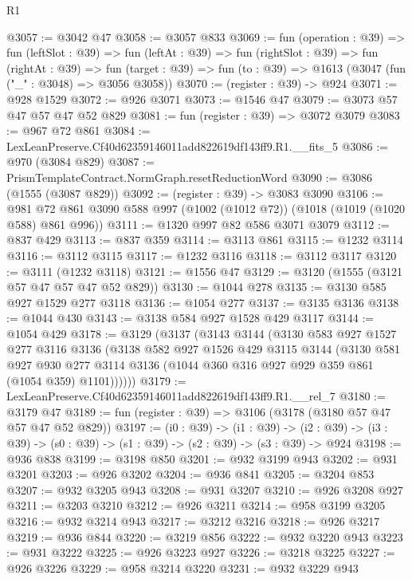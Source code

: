 \begin{lexlean}{R1}
\begin{coremodule}
@3057 := @3042 @47
@3058 := @3057 @833
@3069 := fun (operation : @39) =>
  fun (leftSlot : @39) =>
  fun (leftAt : @39) =>
  fun (rightSlot : @39) =>
  fun (rightAt : @39) =>
  fun (target : @39) => fun (to : @39) => @1613 (@3047 (fun ("_" : @3048) => @3056 @3058))
@3070 := (register : @39) -> @924
@3071 := @928 @1529
@3072 := @926 @3071
@3073 := @1546 @47
@3079 := @3073 @57 @47 @57 @47 @52 @829
@3081 := fun (register : @39) => @3072 @3079
@3083 := @967 @72 @861
@3084 := LexLeanPreserve.Cf40d62359146011add822619df143ff9.R1.__fits_5
@3086 := @970 (@3084 @829)
@3087 := PrismTemplateContract.NormGraph.resetReductionWord
@3090 := @3086 (@1555 (@3087 @829))
@3092 := (register : @39) -> @3083 @3090
@3106 := @981 @72 @861 @3090 @588 @997 (@1002 (@1012 @72)) (@1018 (@1019 (@1020 @588) @861 @996))
@3111 := @1320 @997 @82 @586 @3071 @3079
@3112 := @837 @429
@3113 := @837 @359
@3114 := @3113 @861
@3115 := @1232 @3114
@3116 := @3112 @3115
@3117 := @1232 @3116
@3118 := @3112 @3117
@3120 := @3111 (@1232 @3118)
@3121 := @1556 @47
@3129 := @3120 (@1555 (@3121 @57 @47 @57 @47 @52 @829))
@3130 := @1044 @278
@3135 := @3130 @585 @927 @1529 @277 @3118
@3136 := @1054 @277
@3137 := @3135 @3136
@3138 := @1044 @430
@3143 := @3138 @584 @927 @1528 @429 @3117
@3144 := @1054 @429
@3178 := @3129
    (@3137
      (@3143
        @3144
        (@3130
          @583
          @927
          @1527
          @277
          @3116
          @3136
          (@3138
            @582
            @927
            @1526
            @429
            @3115
            @3144
            (@3130
              @581
              @927
              @930
              @277
              @3114
              @3136
              (@1044 @360 @316 @927 @929 @359 @861 (@1054 @359) @1101))))))
@3179 := LexLeanPreserve.Cf40d62359146011add822619df143ff9.R1.__rel_7
@3180 := @3179 @47
@3189 := fun (register : @39) => @3106 (@3178 (@3180 @57 @47 @57 @47 @52 @829))
@3197 := (i0 : @39) ->
  (i1 : @39) ->
  (i2 : @39) -> (i3 : @39) -> (s0 : @39) -> (s1 : @39) -> (s2 : @39) -> (s3 : @39) -> @924
@3198 := @936 @838
@3199 := @3198 @850
@3201 := @932 @3199 @943
@3202 := @931 @3201
@3203 := @926 @3202
@3204 := @936 @841
@3205 := @3204 @853
@3207 := @932 @3205 @943
@3208 := @931 @3207
@3210 := @926 @3208 @927
@3211 := @3203 @3210
@3212 := @926 @3211
@3214 := @958 @3199 @3205
@3216 := @932 @3214 @943
@3217 := @3212 @3216
@3218 := @926 @3217
@3219 := @936 @844
@3220 := @3219 @856
@3222 := @932 @3220 @943
@3223 := @931 @3222
@3225 := @926 @3223 @927
@3226 := @3218 @3225
@3227 := @926 @3226
@3229 := @958 @3214 @3220
@3231 := @932 @3229 @943

\end{coremodule}
\end{lexlean}
